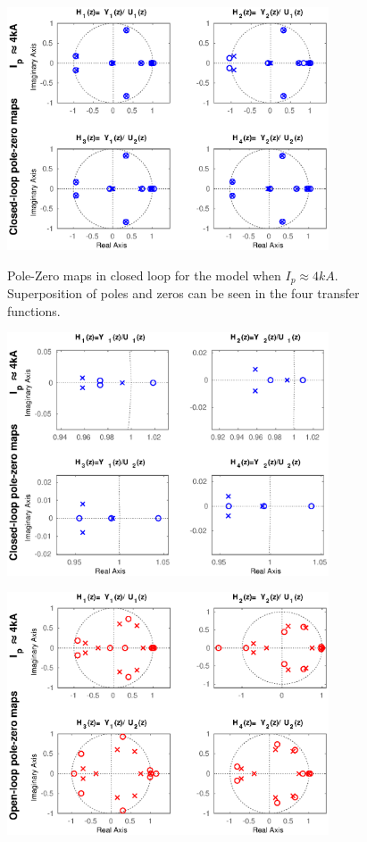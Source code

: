 \begin{figure}
	\centering
	\includegraphics[width=0.85\textwidth]{Chp5/PoleZero/PoleZeroClosePos.eps}
	\label{PoleZeroClosePos}
	\caption{Pole-Zero maps in closed loop for the model when $I_p\approx 4 kA$. Superposition  of poles and zeros can be seen in the four transfer functions.}
\end{figure}	

\begin{figure}
	\centering
	\includegraphics[width=0.85\textwidth]{Chp5/PoleZero/PoleZeroClosePosZoom.eps}
	\label{PoleZeroClosePosZoom}
\end{figure}	


\begin{figure}
	\centering
	\includegraphics[width=0.85\textwidth]{Chp5/PoleZero/PoleZeroOpenPos.eps}
	\label{PoleZeroOpenPos}
\end{figure}	

